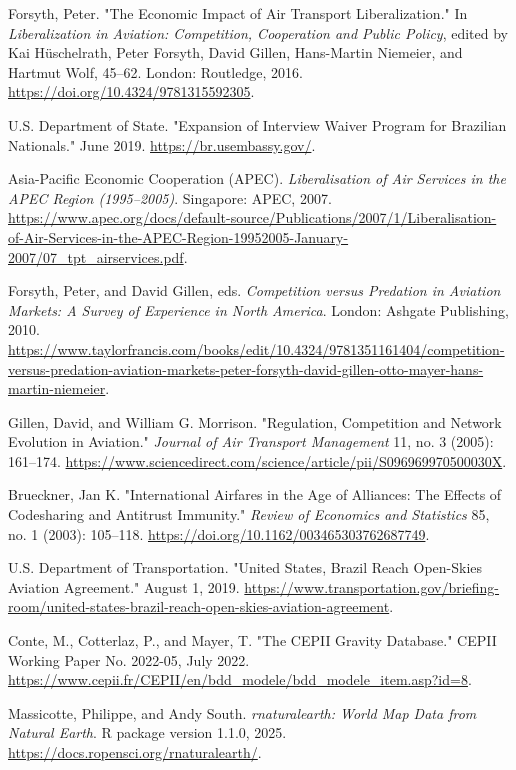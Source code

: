 \documentclass[12pt]{article}
\begin{document}
\begin{thebibliography}{}
Forsyth, Peter. "The Economic Impact of Air Transport Liberalization." In \textit{Liberalization in Aviation: Competition, Cooperation and Public Policy}, edited by Kai Hüschelrath, Peter Forsyth, David Gillen, Hans-Martin Niemeier, and Hartmut Wolf, 45–62. London: Routledge, 2016. \url{https://doi.org/10.4324/9781315592305}.

U.S. Department of State. "Expansion of Interview Waiver Program for Brazilian Nationals." June 2019. \url{https://br.usembassy.gov/}.

Asia-Pacific Economic Cooperation (APEC). \textit{Liberalisation of Air Services in the APEC Region (1995–2005)}. Singapore: APEC, 2007. \url{https://www.apec.org/docs/default-source/Publications/2007/1/Liberalisation-of-Air-Services-in-the-APEC-Region-19952005-January-2007/07_tpt_airservices.pdf}.

Forsyth, Peter, and David Gillen, eds. \textit{Competition versus Predation in Aviation Markets: A Survey of Experience in North America}. London: Ashgate Publishing, 2010. \url{https://www.taylorfrancis.com/books/edit/10.4324/9781351161404/competition-versus-predation-aviation-markets-peter-forsyth-david-gillen-otto-mayer-hans-martin-niemeier}.

Gillen, David, and William G. Morrison. "Regulation, Competition and Network Evolution in Aviation." \textit{Journal of Air Transport Management} 11, no. 3 (2005): 161–174. \url{https://www.sciencedirect.com/science/article/pii/S096969970500030X}.

Brueckner, Jan K. "International Airfares in the Age of Alliances: The Effects of Codesharing and Antitrust Immunity." \textit{Review of Economics and Statistics} 85, no. 1 (2003): 105–118. \url{https://doi.org/10.1162/003465303762687749}.

U.S. Department of Transportation. "United States, Brazil Reach Open-Skies Aviation Agreement." August 1, 2019. \url{https://www.transportation.gov/briefing-room/united-states-brazil-reach-open-skies-aviation-agreement}.

Conte, M., Cotterlaz, P., and Mayer, T. "The CEPII Gravity Database." CEPII Working Paper No. 2022-05, July 2022. \url{https://www.cepii.fr/CEPII/en/bdd_modele/bdd_modele_item.asp?id=8}.

Massicotte, Philippe, and Andy South. \textit{rnaturalearth: World Map Data from Natural Earth}. R package version 1.1.0, 2025. \url{https://docs.ropensci.org/rnaturalearth/}.

\end{thebibliography}
\end{document}
